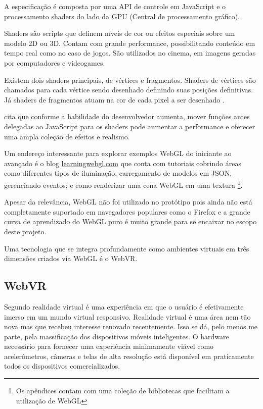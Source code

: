 A especificação é composta por uma API de controle em JavaScript
e o processamento shaders do lado da GPU (Central de processamento
gráfico).

Shaders são scripts que definem níveis de cor ou efeitos especiais
sobre um modelo 2D ou 3D. Contam com grande performance, possibilitando
conteúdo em tempo real como no caso de jogos. São utilizados no
cinema, em imagens geradas por computadores e videogames.

Existem dois shaders principais, de vértices e fragmentos. Shaders de
vértices são chamados para cada vértice sendo desenhado definindo
suas posições definitivas. Já shaders de fragmentos atuam na cor de
cada pixel a ser desenhado \autocite[p.15]{3daps}.

\citet{html5mostwanted} cita que conforme a habilidade do desenvolvedor
aumenta, mover funções antes delegadas ao JavaScript para os shaders
pode aumentar a performance e oferecer uma ampla coleção de efeitos e
realismo.

Um endereço interessante para explorar exemplos WebGL do iniciante ao avançado é o blog
 \url{learningwebgl.com} que conta com tutoriais cobrindo áreas
como diferentes tipos de iluminação, carregamento de modelos em JSON,
gerenciando eventos; e como renderizar uma cena WebGL
em uma textura \autocite[p.42]{3daps}\footnote{Os apêndices contam
com uma coleção de bibliotecas que facilitam a utilização de WebGL}.

Apesar da relevância, WebGL não foi utilizado no protótipo pois
ainda não está completamente suportado em navegadores populares como
o Firefox e a grande curva de aprendizado do WebGL puro é muito grande
para se encaixar no escopo deste projeto.

Uma tecnologia que se integra profundamente como ambientes virtuais
em três dimensões criados via WebGL é o WebVR.
\subsection{WebVR}
Segundo \citet{virtualReality} realidade virtual é uma experiência em
que o usuário é efetivamente imerso em um mundo virtual responsivo.
Realidade virtual é uma área nem tão nova mas que recebeu interesse
renovado recentemente. Isso se dá, pelo menos me parte, pela
massificação dos dispositivos móveis inteligentes. O hardware
necessário para fornecer uma experiência minimamente viável como
acelerômetros, câmeras e telas de alta resolução está disponível
em praticamente todos os dispositivos comercializados.

